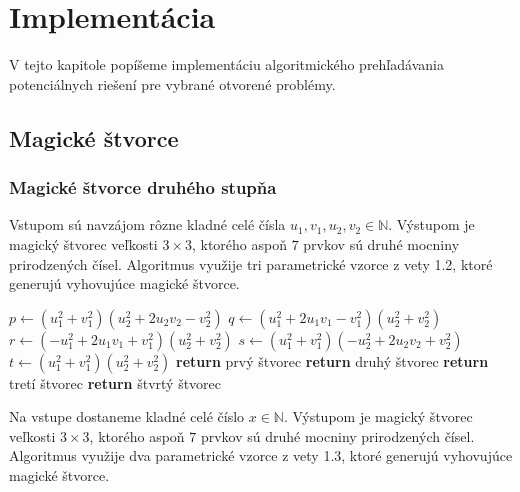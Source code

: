 \chapter{Implementácia}

\label{kap:implementation} %

V tejto kapitole popíšeme implementáciu algoritmického prehľadávania potenciálnych riešení pre vybrané otvorené problémy.

\section{Magické štvorce}

\subsection{Magické štvorce druhého stupňa}

\begin{subalg} Vstupom sú navzájom rôzne kladné celé čísla $u_1, v_1, u_2, v_2 \in \mathbb{N}$. Výstupom je magický štvorec veľkosti $3 \times 3$, ktorého aspoň $7$ prvkov sú druhé mocniny prirodzených čísel. Algoritmus využije tri parametrické vzorce z vety 1.2, ktoré generujú vyhovujúce magické štvorce.
\end{subalg}

\begin{algorithmic}
\State $p \gets (u_1^2 + v_1^2)(u_2^2 + 2u_2 v_2 - v_2^2)$
\State $q \gets (u_1^2 + 2u_1 v_1 - v_1^2)(u_2^2 + v_2^2)$
\State $r \gets (- u_1^2 + 2u_1 v_1 + v_1^2)(u_2^2 + v_2^2)$
\State $s \gets (u_1^2 + v_1^2)(-u_2^2 + 2u_2 v_2 + v_2^2)$
\State $t \gets (u_1^2 + v_1^2)(u_2^2 + v_2^2)$
    \STATE \textbf{return} prvý štvorec
\ENDIF
{}
    \STATE \textbf{return} druhý štvorec
\ENDIF
{}
    \STATE \textbf{return} tretí štvorec
\ENDIF
{}
    \STATE \textbf{return} štvrtý štvorec
\ENDIF
\end{algorithmic}


\begin{subalg} Na vstupe dostaneme kladné celé číslo $x \in \mathbb{N}$. Výstupom je magický štvorec veľkosti $3 \times 3$, ktorého aspoň $7$ prvkov sú druhé mocniny prirodzených čísel. Algoritmus využije dva parametrické vzorce z vety 1.3, ktoré generujú vyhovujúce magické štvorce.
\end{subalg}

